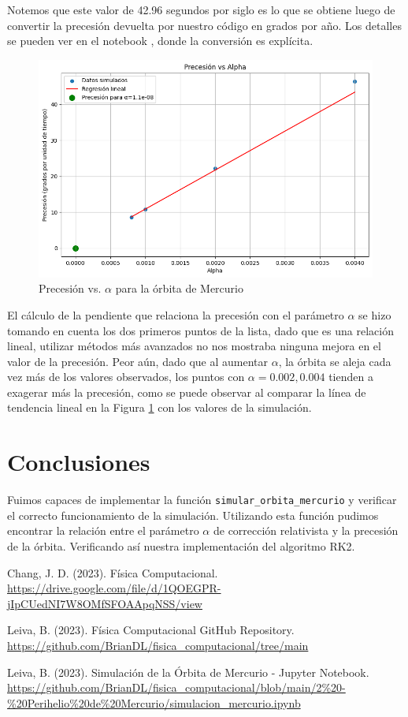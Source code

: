 \documentclass[twocolumn]{article}
\begin{document}
Notemos que este valor de 42.96 segundos por siglo es lo que se obtiene luego de convertir la precesión devuelta por nuestro código en grados por año. Los detalles se pueden ver en el notebook \cite{mercury_notebook}, donde la conversión es explícita.

\begin{figure}[H]
\centering
\includegraphics[width=0.9\columnwidth]{./figures/precesion_vs_alpha_mercurio.png}
\caption{Precesión vs. $\alpha$ para la órbita de Mercurio}
\label{fig:precesion}
\end{figure}

El cálculo de la pendiente que relaciona la precesión con el parámetro $\alpha$ se hizo tomando en cuenta los dos primeros puntos de la lista, dado que es una relación lineal, utilizar métodos más avanzados no nos mostraba ninguna mejora en el valor de la precesión. Peor aún, dado que al aumentar $\alpha$, la órbita se aleja cada vez más de los valores observados, los puntos con $\alpha = 0.002, 0.004$ tienden a exagerar más la precesión, como se puede observar al comparar la línea de tendencia lineal en la Figura \ref{fig:precesion} con los valores de la simulación.

\section{Conclusiones}

Fuimos capaces de implementar la función \texttt{simular\_orbita\_mercurio} y verificar el correcto funcionamiento de la simulación. Utilizando esta función pudimos encontrar la relación entre el parámetro $\alpha$ de corrección relativista y la precesión de la órbita. Verificando así nuestra implementación del algoritmo RK2.

\begin{thebibliography}{3}

Chang, J. D. (2023). Física Computacional. 
\url{https://drive.google.com/file/d/1QOEGPR-jIpCUedNI7W8OMfSFOAApqNSS/view}

Leiva, B. (2023). Física Computacional GitHub Repository. 
\url{https://github.com/BrianDL/fisica_computacional/tree/main}

Leiva, B. (2023). Simulación de la Órbita de Mercurio - Jupyter Notebook. 
\url{https://github.com/BrianDL/fisica_computacional/blob/main/2%20-%20Perihelio%20de%20Mercurio/simulacion_mercurio.ipynb}

\end{thebibliography}
\end{document}

